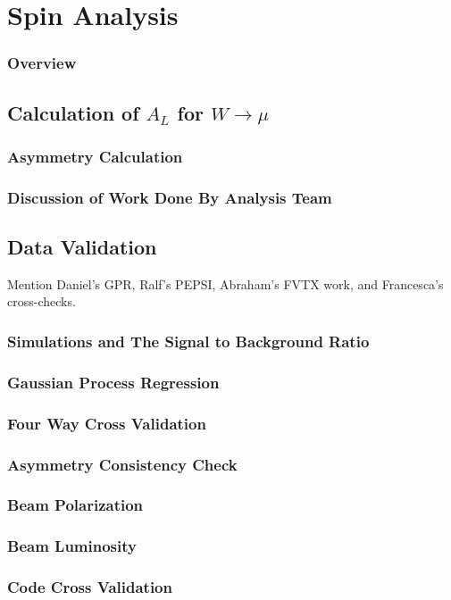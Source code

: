 \chapter{Spin Analysis}
\label{ch:spin_analysis}
\subsection{Overview}

\section{Calculation of $A_{L}$ for $W\rightarrow\mu$}
\subsection{Asymmetry Calculation}
\subsection{Discussion of Work Done By Analysis Team}

\section{Data Validation}
Mention Daniel's GPR, Ralf's PEPSI, Abraham's FVTX work, and Francesca's cross-checks.
\subsection{Simulations and The Signal to Background Ratio}
\subsection{Gaussian Process Regression}
\subsection{Four Way Cross Validation}
\subsection{Asymmetry Consistency Check}
\subsection{Beam Polarization}
\subsection{Beam Luminosity}
\subsection{Code Cross Validation}

